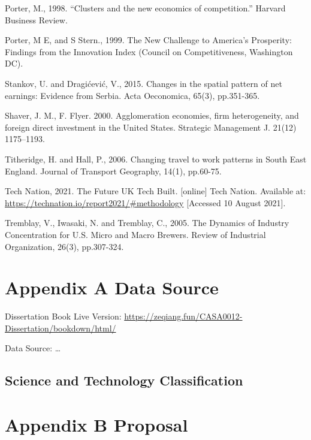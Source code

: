 \documentclass[
  12pt,
  oneside]{book}
\begin{document}
Porter, M., 1998. ``Clusters and the new economics of competition.'' Harvard Business Review.

Porter, M E, and S Stern., 1999. The New Challenge to America's Prosperity: Findings from the Innovation Index (Council on Competitiveness, Washington DC).

Stankov, U. and Dragićević, V., 2015. Changes in the spatial pattern of net earnings: Evidence from Serbia. Acta Oeconomica, 65(3), pp.351-365.

Shaver, J. M., F. Flyer. 2000. Agglomeration economies, firm heterogeneity, and foreign direct investment in the United States. Strategic Management J. 21(12) 1175--1193.

Titheridge, H. and Hall, P., 2006. Changing travel to work patterns in South East England. Journal of Transport Geography, 14(1), pp.60-75.

Tech Nation, 2021. The Future UK Tech Built. {[}online{]} Tech Nation. Available at: \url{https://technation.io/report2021/\#methodology} {[}Accessed 10 August 2021{]}.

Tremblay, V., Iwasaki, N. and Tremblay, C., 2005. The Dynamics of Industry Concentration for U.S. Micro and Macro Brewers. Review of Industrial Organization, 26(3), pp.307-324.

\printbibliography

\hypertarget{appendix-a-data-source}{%
\chapter*{Appendix A Data Source}\label{appendix-a-data-source}}


Dissertation Book Live Version: \url{https://zeqiang.fun/CASA0012-Dissertation/bookdown/html/}

Data Source: \ldots{}

\hypertarget{science-and-technology-classification}{%
\section*{Science and Technology Classification}\label{science-and-technology-classification}}

\hypertarget{appendix-b-proposal}{%
\chapter*{Appendix B Proposal}\label{appendix-b-proposal}}

\enddocument

\printbibliography
\end{document}
